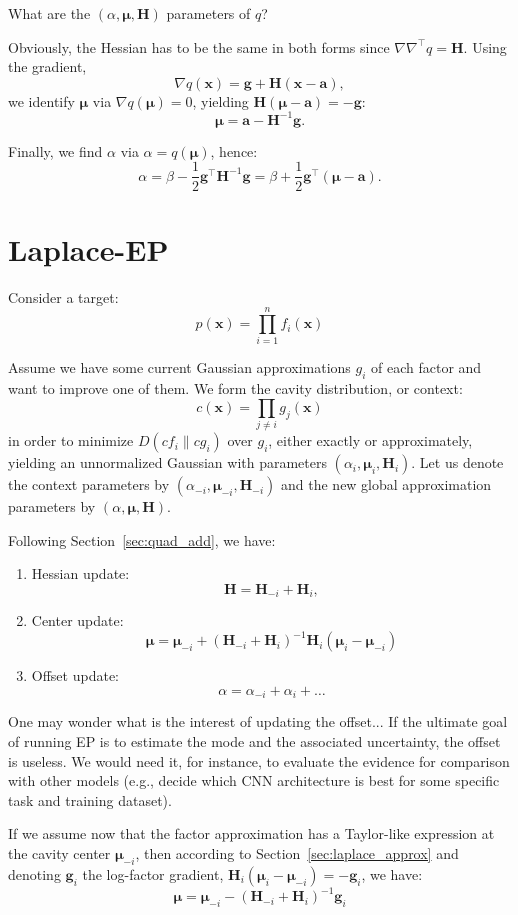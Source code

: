 \documentclass{article}
\def\x{{\mathbf{x}}}
\def\a{{\mathbf{a}}}
\def\m{{\boldsymbol{\mu}}}
\def\H{\mathbf{H}}
\def\g{\mathbf{g}}
\begin{document}
What are the $(\alpha,\m,\H)$ parameters of $q$?

Obviously, the Hessian has to be the same in both forms since $\nabla\nabla^\top q = \H$.
Using the gradient,
$$
\nabla q (\x) = \g + \H (\x-\a),
$$
we identify $\m$ via $\nabla q(\m)=0$, yielding $\H(\m-\a)=-\g$:
$$
\m = \a - \H^{-1}\g.
$$

Finally, we find $\alpha$ via $\alpha=q(\m)$, hence:
$$
\alpha = \beta - \frac{1}{2} \g^\top \H^{-1}\g
= \beta + \frac{1}{2} \g^\top(\m-\a)
.
$$

\section{Laplace-EP}

Consider a target: 
$$
p(\x)=\prod_{i=1}^n f_i(\x)
$$

Assume we have some current Gaussian approximations $g_i$ of each factor and want to improve one of them. We form the cavity distribution, or context:
$$
c(\x) = \prod_{j\not=i} g_j(\x)
$$
in order to minimize $D(cf_i \| cg_i)$ over $g_i$, either exactly or approximately, yielding an unnormalized Gaussian with parameters $(\alpha_i,\m_i,\H_i)$. Let us denote the context parameters by $(\alpha_{-i},\m_{-i},\H_{-i})$ and the new global approximation parameters by $(\alpha,\m,\H)$. 

Following Section~\ref{sec:quad_add}, we have:
\begin{enumerate}
\item Hessian update:
$$
\H = \H_{-i} + \H_i,
$$
\item Center update:
$$
\m = \m_{-i} + (\H_{-i} + \H_i)^{-1}\H_i(\m_i-\m_{-i})
$$
\item Offset update:
$$
\alpha = \alpha_{-i} + \alpha_i + \ldots
$$
\end{enumerate}

One may wonder what is the interest of updating the offset... If the ultimate goal of running EP is to estimate the mode and the associated uncertainty, the offset is useless. We would need it, for instance, to evaluate the evidence for comparison with other models (e.g., decide which CNN architecture is best for some specific task and training dataset).
    
If we assume now that the factor approximation has a Taylor-like expression at the cavity center $\m_{-i}$, then according to Section~\ref{sec:laplace_approx} and denoting $\g_i$ the log-factor gradient, $\H_i (\m_i-\m_{-i}) = -\g_i$, we have:
$$
\m = \m_{-i} - (\H_{-i} + \H_i)^{-1}\g_i
$$
\end{document}
